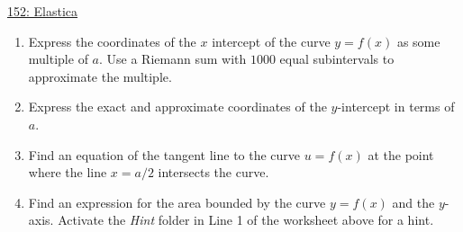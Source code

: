 \documentclass{ximera}
\begin{document}
\begin{question} \label{QKDFeefrfr3}

\begin{onlineOnly}
    \begin{center}
\end{center}
\end{onlineOnly}

\href{https://www.desmos.com/calculator/c3vderglut}{152: Elastica}

\begin{enumerate}

\item Express the coordinates of the $x$ intercept of the curve $y=f(x)$ as some multiple of $a$. Use a Riemann sum with $1000$ equal subintervals to approximate the multiple.

\item Express the exact and approximate coordinates of the $y$-intercept in terms of $a$.

\item Find an equation of the tangent line to the curve $u=f(x)$ at the point where the line $x=a/2$ intersects the curve.

\item Find an expression for the area bounded by the curve $y=f(x)$ and the $y$-axis. Activate the \emph{Hint} folder in Line 1 of the worksheet above for a hint. 

\end{enumerate}

\end{question}
\end{document}
